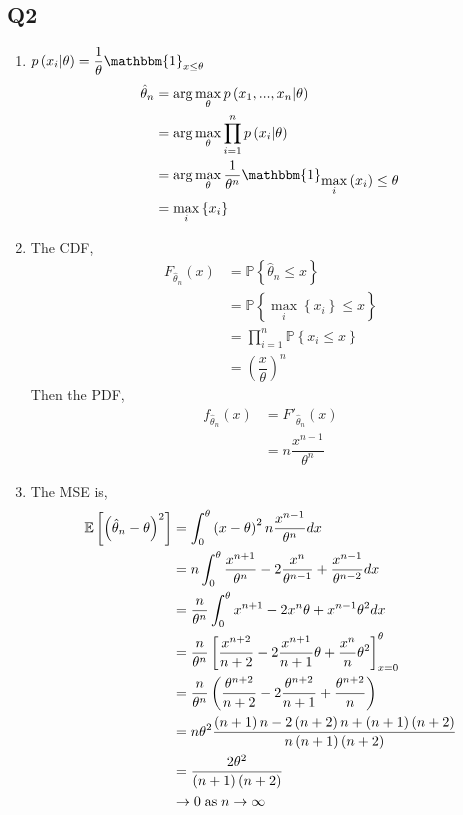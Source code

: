 \documentclass{article}
\begin{document}
\subsection{Q2}
\begin{enumerate}
\item $p\left(x_{i} | \theta\right)  = \dfrac{1}{\theta} \mathbbm{1}_{x \leq  \theta}$
\begin{align*}
\hat{\theta}_{n} &= \arg\displaystyle\max_{\theta} p\left(x_{1}, ..., x_{n} | \theta\right) 
\\ &= \arg\displaystyle\max_{\theta} \displaystyle\prod_{i=1}^{n} p\left(x_{i} | \theta\right)
\\ &= \arg\displaystyle\max_{\theta} \dfrac{1}{\theta^{n}} \mathbbm{1}_{\displaystyle\max_{i} \left(x_{i}\right) \leq  \theta}
\\ &= \displaystyle\max_{i} \left\{x_{i}\right\}
\end{align*}
\item The CDF,
\begin{align*}
F_{\hat{\theta}_{n}}\left(x\right) &= \mathbb{P}\left\{\hat{\theta}_{n} \leq  x\right\}
\\ &= \mathbb{P}\left\{\displaystyle\max_{i} \left\{x_{i}\right\} \leq  x\right\}
\\ &= \displaystyle\prod_{i=1}^{n} \mathbb{P}\left\{x_{i} \leq  x\right\}
\\ &= \left(\dfrac{x}{\theta}\right)^{n}
\end{align*}
Then the PDF,
\begin{align*}
f_{\hat{\theta}_{n}}\left(x\right) &= F'_{\hat{\theta}_{n}}\left(x\right)
\\ &= n \dfrac{x^{n-1}}{\theta^{n}}
\end{align*}
\item The MSE is,
\begin{align*}
\mathbb{E}\left[\left(\hat{\theta}_{n} - \theta\right)^{2}\right] &= \displaystyle\int_{0}^{\theta} \left(x - \theta\right)^{2} n \dfrac{x^{n-1}}{\theta^{n}} dx
\\ &= n \displaystyle\int_{0}^{\theta} \dfrac{x^{n+1}}{\theta^{n}} - 2 \dfrac{x^{n}}{\theta^{n-1}} + \dfrac{x^{n-1}}{\theta^{n-2}} dx
\\ &= \dfrac{n}{\theta^{n}} \displaystyle\int_{0}^{\theta} x^{n+1} - 2 x^{n} \theta + x^{n-1} \theta^{2} dx
\\ &= \dfrac{n}{\theta^{n}} \left[ \dfrac{x^{n+2}}{n+2} - 2 \dfrac{x^{n+1}}{n+1} \theta + \dfrac{x^{n}}{n} \theta^{2} \right]_{x=0}^{\theta}
\\ &= \dfrac{n}{\theta^{n}} \left( \dfrac{\theta^{n+2}}{n+2} - 2 \dfrac{\theta^{n+2}}{n+1} + \dfrac{\theta^{n+2}}{n} \right)
\\ &= n \theta^{2} \dfrac{ \left(n + 1\right) n - 2 \left(n + 2\right) n + \left(n + 1\right) \left(n + 2\right) }{n \left(n + 1\right) \left(n + 2\right)}
\\ &= \dfrac{2 \theta^{2}}{\left(n + 1\right)\left(n + 2\right)}
\\ &  \to  0 \text{\;as\;} n  \to  \infty
\end{align*}
\end{enumerate}
\end{document}
